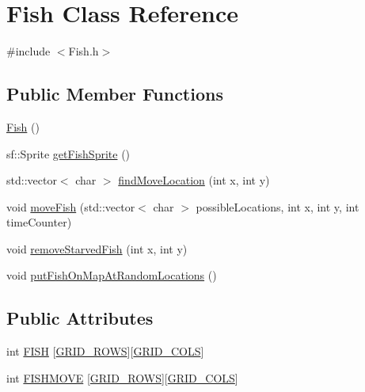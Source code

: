 \hypertarget{class_fish}{}\section{Fish Class Reference}
\label{class_fish}


{\ttfamily \#include $<$Fish.\+h$>$}

\subsection*{Public Member Functions}
\begin{DoxyCompactItemize}
\item 
\mbox{\hyperlink{class_fish_a265fa9dc23037b5f621ff5f2b2731e9b}{Fish}} ()
\item 
sf\+::\+Sprite \mbox{\hyperlink{class_fish_ae23421c4d781b462050c28d085701383}{get\+Fish\+Sprite}} ()
\item 
std\+::vector$<$ char $>$ \mbox{\hyperlink{class_fish_a89b819c754df5cdfd6b403aac953d826}{find\+Move\+Location}} (int x, int y)
\item 
void \mbox{\hyperlink{class_fish_a897b6f127f48eed86bdf9e76727e858b}{move\+Fish}} (std\+::vector$<$ char $>$ possible\+Locations, int x, int y, int time\+Counter)
\item 
void \mbox{\hyperlink{class_fish_a567bd1b821e032d36cdf81225452f57b}{remove\+Starved\+Fish}} (int x, int y)
\item 
void \mbox{\hyperlink{class_fish_a834b0a13a75ea8fa873c88a175c89133}{put\+Fish\+On\+Map\+At\+Random\+Locations}} ()
\end{DoxyCompactItemize}
\subsection*{Public Attributes}
\begin{DoxyCompactItemize}
\item 
int \mbox{\hyperlink{class_fish_ab77a195537e7505d26b3347a4a4d2776}{F\+I\+SH}} \mbox{[}\mbox{\hyperlink{_config_8h_a5ba0b105774bfdc09ce545d73dcdedd3}{G\+R\+I\+D\+\_\+\+R\+O\+WS}}\mbox{]}\mbox{[}\mbox{\hyperlink{_config_8h_a881e2cda79b5951641b07f678f6ef929}{G\+R\+I\+D\+\_\+\+C\+O\+LS}}\mbox{]}
\item 
int \mbox{\hyperlink{class_fish_ac362bdf589cc5638f43a5449b6ed9c1f}{F\+I\+S\+H\+M\+O\+VE}} \mbox{[}\mbox{\hyperlink{_config_8h_a5ba0b105774bfdc09ce545d73dcdedd3}{G\+R\+I\+D\+\_\+\+R\+O\+WS}}\mbox{]}\mbox{[}\mbox{\hyperlink{_config_8h_a881e2cda79b5951641b07f678f6ef929}{G\+R\+I\+D\+\_\+\+C\+O\+LS}}\mbox{]}
\end{DoxyCompactItemize}


